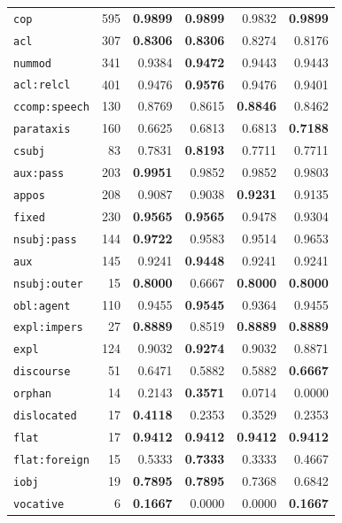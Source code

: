 \begin{table}[ht]
\begin{minipage}[t]{0.60\linewidth}
\begin{tabular}{l r  r r r r}
\texttt{cop} & 595 & \textbf{0.9899} & \textbf{0.9899} & 0.9832 & \textbf{0.9899} \\
\texttt{acl} & 307 & \textbf{0.8306} & \textbf{0.8306} & 0.8274 & 0.8176 \\
\texttt{nummod} & 341 & 0.9384 & \textbf{0.9472} & 0.9443 & 0.9443 \\
\texttt{acl\!:\!relcl} & 401 & 0.9476 & \textbf{0.9576} & 0.9476 & 0.9401 \\
\texttt{ccomp\!:\!speech} & 130 & 0.8769 & 0.8615 & \textbf{0.8846} & 0.8462 \\
\texttt{parataxis} & 160 & 0.6625 & 0.6813 & 0.6813 & \textbf{0.7188} \\
\texttt{csubj} & 83 & 0.7831 & \textbf{0.8193} & 0.7711 & 0.7711 \\
\texttt{aux\!:\!pass} & 203 & \textbf{0.9951} & 0.9852 & 0.9852 & 0.9803 \\
\texttt{appos} & 208 & 0.9087 & 0.9038 & \textbf{0.9231} & 0.9135 \\
\texttt{fixed} & 230 & \textbf{0.9565} & \textbf{0.9565} & 0.9478 & 0.9304 \\
\texttt{nsubj\!:\!pass} & 144 & \textbf{0.9722} & 0.9583 & 0.9514 & 0.9653 \\
\texttt{aux} & 145 & 0.9241 & \textbf{0.9448} & 0.9241 & 0.9241 \\
\texttt{nsubj\!:\!outer} & 15 & \textbf{0.8000} & 0.6667 & \textbf{0.8000} & \textbf{0.8000} \\
\texttt{obl\!:\!agent} & 110 & 0.9455 & \textbf{0.9545} & 0.9364 & 0.9455 \\
\texttt{expl\!:\!impers} & 27 & \textbf{0.8889} & 0.8519 & \textbf{0.8889} & \textbf{0.8889} \\
\texttt{expl} & 124 & 0.9032 & \textbf{0.9274} & 0.9032 & 0.8871 \\
\texttt{discourse} & 51 & 0.6471 & 0.5882 & 0.5882 & \textbf{0.6667} \\
\texttt{orphan} & 14 & 0.2143 & \textbf{0.3571} & 0.0714 & 0.0000 \\
\texttt{dislocated} & 17 & \textbf{0.4118} & 0.2353 & 0.3529 & 0.2353 \\
\texttt{flat} & 17 & \textbf{0.9412} & \textbf{0.9412} & \textbf{0.9412} & \textbf{0.9412} \\
\texttt{flat\!:\!foreign} & 15 & 0.5333 & \textbf{0.7333} & 0.3333 & 0.4667 \\
\texttt{iobj} & 19 & \textbf{0.7895} & \textbf{0.7895} & 0.7368 & 0.6842 \\
\texttt{vocative} & 6 & \textbf{0.1667} & 0.0000 & 0.0000 & \textbf{0.1667} \\

\end{tabular}
\end{minipage}
\end{table}
